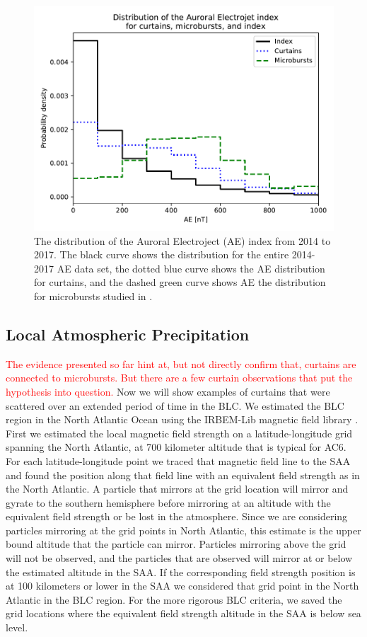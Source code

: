 \documentclass[draft]{agujournal2019}
\begin{document}
\begin{figure}
\includegraphics[width=\textwidth]{ac6_curtain_microburst_AE_dist.pdf}
\caption{The distribution of the Auroral Electroject (AE) index from 2014 to 2017. The black curve shows the distribution for the entire 2014-2017 AE data set, the dotted blue curve shows the AE distribution for curtains, and the dashed green curve shows AE the distribution for microbursts studied in .}
\label{ae_dist}
\end{figure}

\subsection{Local Atmospheric Precipitation}
\textcolor{red}{The evidence presented so far hint at, but not directly confirm that, curtains are connected to microbursts. But there are a few curtain observations that put the hypothesis into question. }
Now we will show examples of curtains that were scattered over an extended period of time in the BLC. We estimated the BLC region in the North Atlantic Ocean using the IRBEM-Lib magnetic field library \cite{irbem}. First we estimated the local magnetic field strength on a latitude-longitude grid spanning the North Atlantic, at 700 kilometer altitude that is typical for AC6. For each latitude-longitude point we traced that magnetic field line to the SAA and found the position along that field line with an equivalent field strength as in the North Atlantic. A particle that mirrors at the grid location will mirror and gyrate to the southern hemisphere before mirroring at an altitude with the equivalent field strength or be lost in the atmosphere. Since we are considering particles mirroring at the grid points in North Atlantic, this estimate is the upper bound altitude that the particle can mirror. Particles mirroring above the grid will not be observed, and the particles that are observed will mirror at or below the estimated altitude in the SAA. If the corresponding field strength position is at 100 kilometers or lower in the SAA we considered that grid point in the North Atlantic in the BLC region. For the more rigorous BLC criteria, we saved the grid locations where the equivalent field strength altitude in the SAA is below sea level. 
\end{document}

